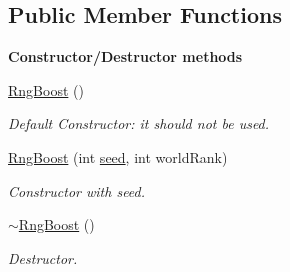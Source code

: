 \subsection*{Public Member Functions}
\begin{Indent}{\bf Constructor/\-Destructor methods}\par
\begin{DoxyCompactItemize}
\item 
\hyperlink{class_q_u_e_s_o_1_1_rng_boost_a6fa78750ef38de7034414b5e701bc544}{Rng\-Boost} ()
\begin{DoxyCompactList}\small\item\em Default Constructor\-: it should not be used. \end{DoxyCompactList}\item 
\hyperlink{class_q_u_e_s_o_1_1_rng_boost_a8d2d2582ba8c3c892e0e20798730f0a9}{Rng\-Boost} (int \hyperlink{class_q_u_e_s_o_1_1_rng_base_a3094da86084e56faaae9325f1117f9a3}{seed}, int world\-Rank)
\begin{DoxyCompactList}\small\item\em Constructor with seed. \end{DoxyCompactList}\item 
\hyperlink{class_q_u_e_s_o_1_1_rng_boost_a96ffa32ae3700ca164db8799d32b19ca}{$\sim$\-Rng\-Boost} ()
\begin{DoxyCompactList}\small\item\em Destructor. \end{DoxyCompactList}\end{DoxyCompactItemize}
\end{Indent}
